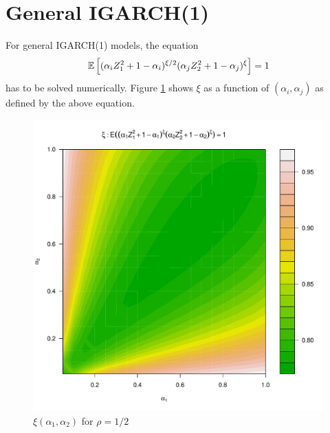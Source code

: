 \documentclass{article}
\begin{document}
\section{General IGARCH(1)}
For general IGARCH(1) models, the equation
\begin{equation*}
  \mathbb{E} \left[
    (
    \alpha_i Z_1^2 + 1 - \alpha_i
    )^{\xi/2}
    (
    \alpha_j Z_2^2 + 1 - \alpha_j
    )^\xi\right] = 1
\end{equation*}
has to be solved numerically. Figure \ref{fig:xi_rho0.5} shows $\xi$
as a function of $(\alpha_i, \alpha_j)$ as defined by the
above equation.
\begin{figure}[htb!]
  \centering
  \includegraphics[scale=0.4]{igarch_rho0dot5.pdf}
  \caption{$\xi(\alpha_1, \alpha_2)$ for $\rho = 1/2$}
  \label{fig:xi_rho0.5}
\end{figure}
\end{document}
